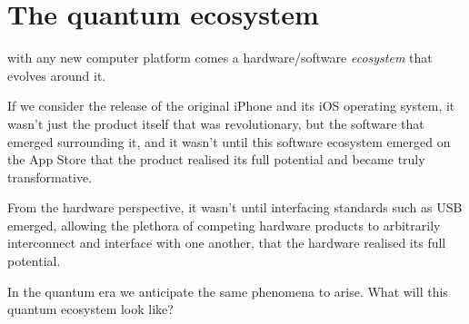 %
%

\section{The quantum ecosystem}

\newline

 with any new computer platform comes a hardware/software \textit{ecosystem} that evolves around it.

If we consider the release of the original iPhone and its iOS operating system, it wasn't just the product itself that was revolutionary, but the software that emerged surrounding it, and it wasn't until this software ecosystem emerged on the App Store that the product realised its full potential and became truly transformative.

From the hardware perspective, it wasn't until interfacing standards such as USB emerged, allowing the plethora of competing hardware products to arbitrarily interconnect and interface with one another, that the hardware realised its full potential.

In the quantum era we anticipate the same phenomena to arise. What will this quantum ecosystem look like?


